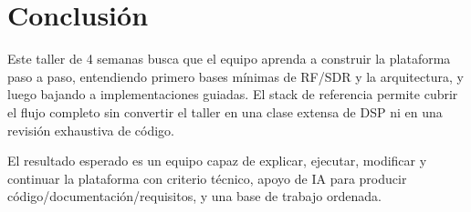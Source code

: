 \documentclass[11pt,a4paper]{article}
\begin{document}
\section*{Conclusión}

Este taller de 4 semanas busca que el equipo aprenda a construir la plataforma paso a paso, entendiendo primero bases mínimas de RF/SDR y la arquitectura, y luego bajando a implementaciones guiadas. El stack de referencia permite cubrir el flujo completo sin convertir el taller en una clase extensa de DSP ni en una revisión exhaustiva de código.

El resultado esperado es un equipo capaz de explicar, ejecutar, modificar y continuar la plataforma con criterio técnico, apoyo de IA para producir código/documentación/requisitos, y una base de trabajo ordenada.
\end{document}
